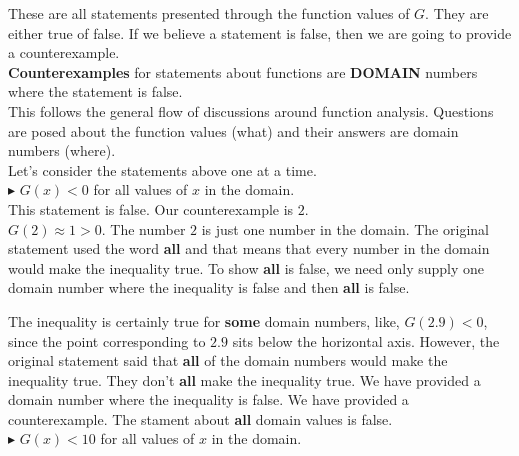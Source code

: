 \documentclass{ximera}
\begin{document}
These are all statements presented through the function values of $G$.  They are either true of false.  If we believe a statement is false, then we are going to provide a counterexample. \\

\textbf{\textcolor{red!70!black}{Counterexamples}} for statements about functions are \textbf{\textcolor{red!70!black}{DOMAIN}} numbers where the statement is false. \\


This follows the general flow of discussions around function analysis.  Questions are posed about the function values (what) and their answers are domain numbers (where). \\


Let's consider the statements above one at a time. \\












\textbf{\textcolor{red!70!darkgray}{$\blacktriangleright$}} $G(x) < 0$  for all values of $x$ in the domain. \\


This statement is false. Our counterexample is $2$.  \\

$G(2) \approx 1 > 0$. The number $2$ is just one number in the domain.   The original statement used the word \textbf{all} and that means that every number in the domain would make the inequality true.  To show \textbf{all} is false, we need only supply one domain number where the inequality is false and then \textbf{all} is false.

The inequality is certainly true for \textbf{some} domain numbers, like, $G(2.9) < 0$, since the point corresponding to $2.9$ sits below the horizontal axis.  However, the original statement said that \textbf{all} of the domain numbers would make the inequality true. They don't \textbf{all} make the inequality true.  We have provided a domain number where the inequality is false. We have provided a counterexample. The stament about \textbf{all} domain values is false.\\









\textbf{\textcolor{red!70!darkgray}{$\blacktriangleright$}} $G(x) < 10$  for all values of $x$ in the domain. \\
\end{document}
